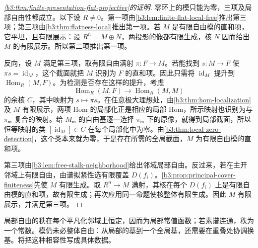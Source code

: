 \begin{proof}[\cref{b3:thm:finite-presentation-flat-projective}的证明]
	零环上的模只能为零，三项及局部自由性都成立。以下设 \(R\ne0\)。第一项由\cref{b3:lem:finite-flat-local-free}推出第三项；第三项由\cref{b3:thm:flatness-local}推出第一项。若 \(M\) 是有限自由模的直和项，它平坦，且有限展示：设 \(R^n=M\oplus N\)，两投影的像都有限生成，核 \(N\) 因而给出 \(M\) 的有限展示。所以第二项推出第一项。

	反向，设 \(M\) 满足第三项，取有限自由满射 \(\pi:F\to M\)。若能找到 \(s:M\to F\) 使 \(\pi s=\operatorname{id}_M\)，这个截面就把 \(M\) 识别为 \(F\) 的直和项。因此只需将 \(\operatorname{id}_M\) 提升到 \(\operatorname{Hom}_R(M,F)\)。为检测是否存在这样的提升，考虑
	\[
		\operatorname{Hom}_R(M,F)\longrightarrow\operatorname{Hom}_R(M,M)
	\]
	的余核 \(C\)，其中映射为 \(s\mapsto\pi s\)。在任意极大理想处，由\cref{b3:thm:hom-localization}及 \(M\) 有限展示，两项 Hom 的局部化正是相应的局部 Hom，所示映射也识别为与 \(\pi_{\mathfrak m}\) 复合的映射。给 \(M_{\mathfrak m}\) 的自由基逐一选择 \(\pi_{\mathfrak m}\) 下的原像，就得到局部截面，所以恒等映射的类 \([\operatorname{id}_M]\in C\) 在每个局部化中为零。由\cref{b3:thm:local-zero-detection}，这个类本来就为零，于是存在所需的全局截面，\(M\) 为有限自由模的直和项。

	第三项由\cref{b3:lem:free-stalk-neighborhood}给出邻域局部自由。反过来，若在主开邻域上有限自由，由谱拟紧性选有限覆盖 \(D(f_i)\)。\cref{b3:prop:principal-cover-finiteness}先使 \(M\) 有限生成。取 \(R^n\to M\) 满射，其核在每个 \(D(f_i)\) 上是有限自由模的直和项，故有限生成；再次应用同一命题使核整体有限生成。因此 \(M\) 有限展示，并满足第三项。
\end{proof}

局部自由的秩在每个平凡化邻域上恒定，因而为局部常值函数；若素谱连通，秩为一个常数。模仍未必整体自由：从局部的基到一个全局基，还需要在重叠处协调换基。将把这种相容性写成具体数据。
